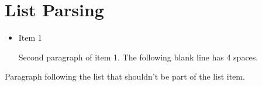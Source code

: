 
\def\mytitle{MMD List Parsing Test}

\part{List Parsing}
\label{listparsing}

\begin{itemize}
\item Item 1

Second paragraph of item 1.
The following blank line has 4 spaces.

\end{itemize}

Paragraph following the list that shouldn't be part of the list item.




